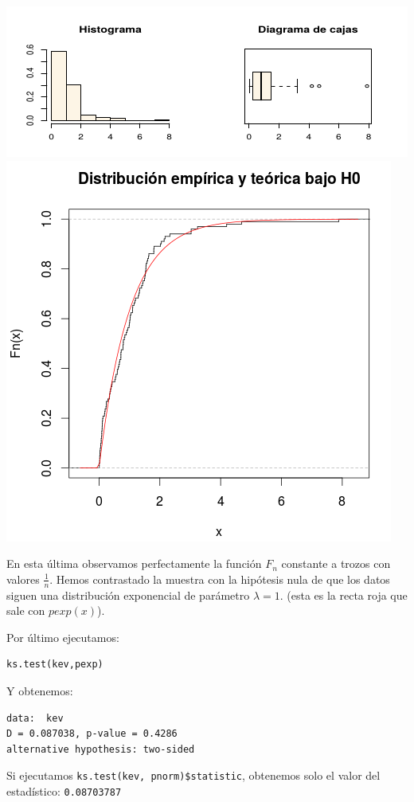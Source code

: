 \documentclass[nochap]{apuntes}
\begin{document}
\begin{example}
\includegraphics[scale=0.8]{img/contrasteks3.png}
\includegraphics[scale=0.5]{img/contrasteks4.png}

En esta última observamos perfectamente la función $F_n$ constante a trozos con valores $\frac{1}{n}$. Hemos contrastado la muestra con la hipótesis nula de que los datos siguen una distribución exponencial de parámetro $\lambda = 1$. (esta es la recta roja que sale con $pexp(x)$).

Por último ejecutamos:
\begin{verbatim}
ks.test(kev,pexp)
\end{verbatim}

Y obtenemos:
\begin{verbatim}
data:  kev
D = 0.087038, p-value = 0.4286
alternative hypothesis: two-sided
\end{verbatim}

Si ejecutamos \verb|ks.test(kev, pnorm)$statistic|, obtenemos solo el valor del estadístico: \verb|0.08703787| 

\end{example}
\end{document}
